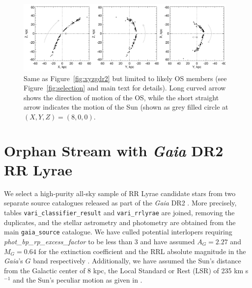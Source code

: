 \documentclass[a4paper,useAMS,usenatbib]{mnras}
\newcommand{\Gaia}{{\it Gaia}}
\newcommand{\gaia}{\textit{Gaia} }
\begin{document}
%


\begin{figure}
  \centering
  \includegraphics[width=0.97\textwidth]{orphan_paper_xyz_members.pdf}
  \caption[]{Same as Figure~\ref{fig:xyzgdr2} but limited to likely OS
    members (see Figure~\ref{fig:selection} and main text for
    details). Long curved arrow shows the direction of motion of the
    OS, while the short straight arrow indicates the motion of the Sun
    (shown as grey filled circle at $(X,Y,Z)=(8,0,0)$.}
   \label{fig:xyzmem}
\end{figure}
%

\section{Orphan Stream with \gaia DR2 RR Lyrae}

We select a high-purity all-sky sample of RR Lyrae candidate stars
from two separate source catalogues released as part of the \gaia DR2
\citep[][]{Prusti2016, Brown2018}. More precisely, tables
\texttt{vari\_classifier\_result} and \texttt{vari\_rrlyrae}
\citep[see][]{Clementini2018,Holl2018} are joined, removing the
duplicates, and the stellar astrometry and photometry are obtained
from the main \texttt{gaia\_source} catalogue. We have culled
potential interlopers requiring \textit{phot\_bp\_rp\_excess\_factor}
to be less than 3 and have assumed $A_G=2.27$ and $M_G=0.64$ for the
extinction coefficient and the RRL absolute magnitude in the \Gaia's
$G$ band respectively \citep[see][for further
  details]{Iorio2018}. Additionally, we have assumed the Sun's
distance from the Galactic center of 8 kpc, the Local Standard or Rest
(LSR) of 235 km s$^{-1}$ and the Sun's peculiar motion as given in
\citet{LSR}.
\end{document}
